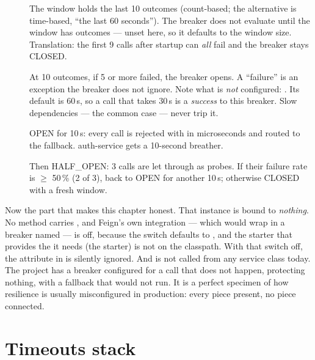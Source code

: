 \begin{description}
  \item[] The window holds the last 10 outcomes (count-based;
  the alternative is time-based, ``the last 60 seconds''). The breaker
  does not evaluate until the window has
   outcomes --- unset here, so it
  defaults to the window size. Translation: the first 9 calls after
  startup can \emph{all} fail and the breaker stays CLOSED.
  \item[] At 10 outcomes, if 5 or more failed, the breaker opens.
  A ``failure'' is an exception the breaker does not ignore. Note what
  is \emph{not} configured: . Its
  default is 60\,s, so a call that takes 30\,s is a \emph{success} to
  this breaker. Slow dependencies --- the common case --- never trip
  it.
  \item[] OPEN for 10\,s: every call is rejected with
   in microseconds and routed to the
  fallback. auth-service gets a 10-second breather.
  \item[] Then HALF\_OPEN: 3 calls are let through as probes. If
  their failure rate is $\ge$ 50\,\% (2 of 3), back to OPEN for another
  10\,s; otherwise CLOSED with a fresh window.
\end{description}

Now the part that makes this chapter honest. That 
instance is bound to \emph{nothing}. No method carries
, and Feign's own
integration --- which would wrap  in a breaker named
 --- is off, because the
switch  defaults to
, and the starter that provides the
 it needs (the
 starter) is not on the classpath.
With that switch off, the  attribute in
 is silently ignored. And  is not called
from any service class today. The project has a breaker configured for
a call that does not happen, protecting nothing, with a fallback that
would not run. It is a perfect specimen of how resilience is usually
misconfigured in production: every piece present, no piece connected.

\section{Timeouts stack}

